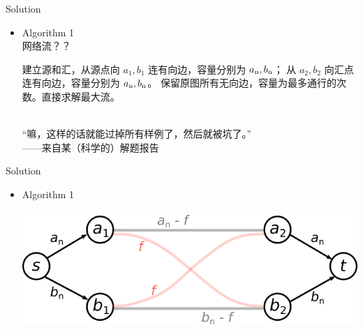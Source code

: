 \documentclass[UTF8]{beamer}
\begin{document}
\begin{frame}{Solution}

\begin{itemize}
    \item Algorithm 1 \\
        网络流？？

        \pause
        建立源和汇，从源点向 $a_1, b_1$ 连有向边，容量分别为 $a_{\rm n}, b_{\rm n}$；
        从 $a_2, b_2$ 向汇点连有向边，容量分别为 $a_{\rm n}, b_{\rm n}$。
        保留原图所有无向边，容量为最多通行的次数。直接求解最大流。

        \pause
        　\\
        “嘛，这样的话就能过掉所有样例了，然后就被坑了。”\\
        \small{——来自某（科学的）解题报告}
\end{itemize}

\end{frame}

\begin{frame}{Solution}

\begin{itemize}
    \item Algorithm 1 \\
        　\\
        \includegraphics[scale=0.35]{bridge-incorrect.png}
\end{itemize}

\end{frame}
\end{document}

